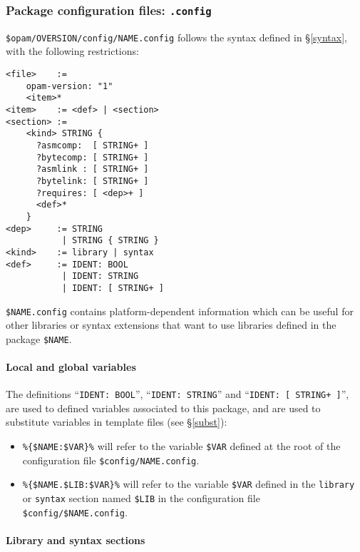 \documentclass[a4paper,11pt]{article}
\begin{document}
\subsubsection{Package configuration files: {\tt .config}}
\label{dotconfig}

\verb+$opam/OVERSION/config/NAME.config+ follows the syntax defined in
\S\ref{syntax}, with the following restrictions:

{\small
\begin{Verbatim}[frame=single]
<file>    :=
    opam-version: "1"
    <item>*
<item>    := <def> | <section>
<section> :=
    <kind> STRING {
      ?asmcomp:  [ STRING+ ]
      ?bytecomp: [ STRING+ ]
      ?asmlink : [ STRING+ ]
      ?bytelink: [ STRING+ ]
      ?requires: [ <dep>+ ]
      <def>*
    }
<dep>     := STRING 
           | STRING { STRING }
<kind>    := library | syntax
<def>     := IDENT: BOOL
           | IDENT: STRING
           | IDENT: [ STRING+ ]
\end{Verbatim}
}

\verb+$NAME.config+ contains platform-dependent information which can
be useful for other libraries or syntax extensions that want to use
libraries defined in the package \verb+$NAME+.

\paragraph{Local and global variables}

The definitions ``{\tt IDENT: BOOL}'', ``{\tt IDENT: STRING}'' and ``{\tt IDENT:
  [ STRING+ ]}'', are used to defined variables associated to this
package, and are used to substitute variables in template files (see
\S\ref{subst}):

\begin{itemize}

\item \verb+%{$NAME:$VAR}%+ will refer to the variable \verb+$VAR+
  defined at the root of the configuration file \verb+$config/NAME.config+.

\item \verb+%{$NAME.$LIB:$VAR}%+ will refer to the variable \verb+$VAR+
  defined in the {\tt library} or {\tt syntax} section named
  \verb+$LIB+ in the configuration file \verb+$config/$NAME.config+.

\end{itemize}

\paragraph{Library and syntax sections}
\end{document}
